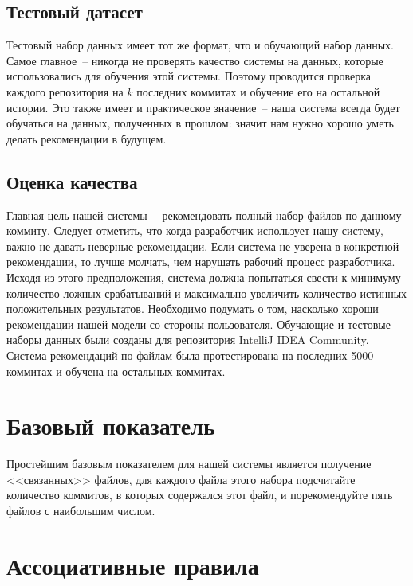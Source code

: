 \documentclass[times]{itmo-student-thesis}
\begin{document}
\subsection{Тестовый датасет}
Тестовый набор данных имеет тот же формат, что и обучающий набор данных. Самое главное~-- никогда не проверять качество системы на данных, которые использовались для обучения этой системы. Поэтому проводится проверка каждого репозитория на $k$ последних коммитах и обучение его на остальной истории. Это также имеет и практическое значение~-- наша система всегда будет обучаться на данных, полученных в прошлом: значит нам нужно хорошо уметь делать рекомендации в будущем.
\subsection{Оценка качества}
Главная цель нашей системы~-- рекомендовать полный набор файлов по данному коммиту. Следует отметить, что когда разработчик использует нашу систему, важно не давать неверные рекомендации. Если система не уверена в конкретной рекомендации, то лучше молчать, чем нарушать рабочий процесс разработчика. Исходя из этого предположения, система должна попытаться свести к минимуму количество ложных срабатываний и максимально увеличить количество истинных положительных результатов. Необходимо подумать о том, насколько хороши рекомендации нашей модели со стороны пользователя. Обучающие и тестовые наборы данных были созданы для репозитория IntelliJ IDEA Community. Система рекомендаций по файлам была протестирована на последних 5000 коммитах и обучена на остальных коммитах.
\section{Базовый показатель}
Простейшим базовым показателем для нашей системы является получение <<связанных>> файлов, для каждого файла этого набора подсчитайте количество коммитов, в которых содержался этот файл, и порекомендуйте пять файлов с наибольшим числом. %
\section{Ассоциативные правила}
\end{document}
